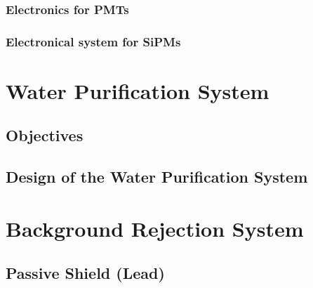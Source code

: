 \documentclass[12pt,a4paper]{book}
\begin{document}
			\subsubsection[Electronic Readout for PMTs]{Electronics for PMTs}\label{subsubsec:PMTsElectronicalSystem}
			
			
			\subsubsection[Electronic Readout for SiPMs]{Electronical system for SiPMs}\label{subsubsec:SiPMsElectronicalSystem}
			
		
	\section{Water Purification System}\label{sec:UltraPureWaterSystem}
		
		\subsection{Objectives}\label{subsec:IntroductionWaterSystem}
		 
					
		\subsection{Design of the Water Purification System}\label{subsec:SetUpWaterSystem}
		
	
	\section{Background Rejection System}\label{sec:IntroductionBackground}
	 
	
		\subsection{Passive Shield (Lead)}\label{subsec:SetUpPassiveShield}
		
		
\end{document}
